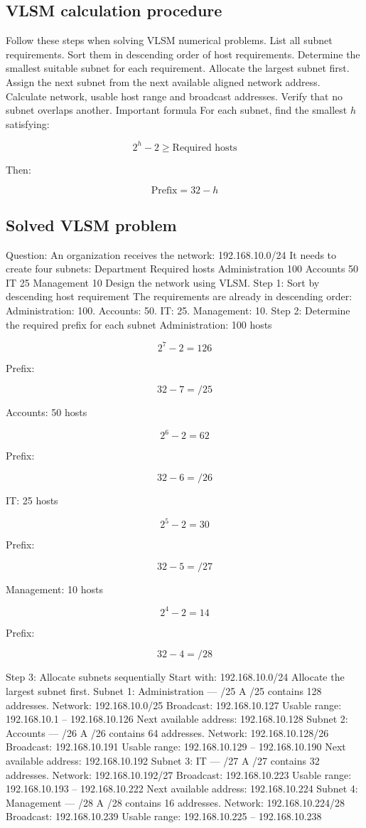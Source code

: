 \subsection{VLSM calculation procedure}
Follow these steps when solving VLSM numerical problems.
List all subnet requirements.
Sort them in descending order of host requirements.
Determine the smallest suitable subnet for each requirement.
Allocate the largest subnet first.
Assign the next subnet from the next available aligned network address.
Calculate network, usable host range and broadcast addresses.
Verify that no subnet overlaps another.
Important formula
For each subnet, find the smallest $h$ satisfying:

\[
\boxed{2^h-2\geq\text{Required hosts}}
\]

Then:

\[
\boxed{\text{Prefix}=32-h}
\]

\subsection{Solved VLSM problem}
Question:
An organization receives the network:
192.168.10.0/24
It needs to create four subnets:
Department
Required hosts
Administration
100
Accounts
50
IT
25
Management
10
Design the network using VLSM.
Step 1: Sort by descending host requirement
The requirements are already in descending order:
Administration: 100.
Accounts: 50.
IT: 25.
Management: 10.
Step 2: Determine the required prefix for each subnet
Administration: 100 hosts

\[
2^7-2=126
\]

Prefix:

\[
32-7=/25
\]

Accounts: 50 hosts

\[
2^6-2=62
\]

Prefix:

\[
32-6=/26
\]

IT: 25 hosts

\[
2^5-2=30
\]

Prefix:

\[
32-5=/27
\]

Management: 10 hosts

\[
2^4-2=14
\]

Prefix:

\[
32-4=/28
\]

Step 3: Allocate subnets sequentially
Start with:
192.168.10.0/24
Allocate the largest subnet first.
Subnet 1: Administration --- /25
A /25 contains 128 addresses.
Network:
192.168.10.0/25
Broadcast:
192.168.10.127
Usable range:
192.168.10.1 -- 192.168.10.126
Next available address:
192.168.10.128
Subnet 2: Accounts --- /26
A /26 contains 64 addresses.
Network:
192.168.10.128/26
Broadcast:
192.168.10.191
Usable range:
192.168.10.129 -- 192.168.10.190
Next available address:
192.168.10.192
Subnet 3: IT --- /27
A /27 contains 32 addresses.
Network:
192.168.10.192/27
Broadcast:
192.168.10.223
Usable range:
192.168.10.193 -- 192.168.10.222
Next available address:
192.168.10.224
Subnet 4: Management --- /28
A /28 contains 16 addresses.
Network:
192.168.10.224/28
Broadcast:
192.168.10.239
Usable range:
192.168.10.225 -- 192.168.10.238
